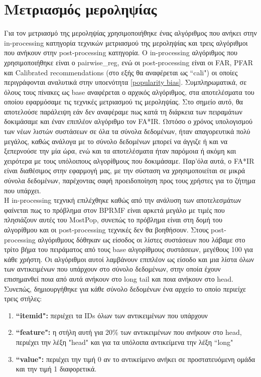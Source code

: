 \newpage
\section{Μετριασμός μεροληψίας}
\noindent Για τον μετριασμό της μεροληψίας χρησιμοποιήθηκε ένας αλγόριθμος που ανήκει στην in-processing κατηγορία τεχνικών μετριασμού της μεροληψίας και τρεις αλγόριθμοι που ανήκουν στην post-processing κατηγορία. Ο in-processing αλγόριθμος που χρησιμοποιήθηκε είναι ο pairwise\_reg, ενώ οι post-processing είναι οι FAR, PFAR και Calibrated recommendations (στο εξής θα αναφέρεται ως ``cali") οι οποίες περιγράφονται αναλυτικά στην υποενότητα \ref{popularity bias}. Συμπληρωματικά, σε όλους τους πίνακες ως base αναφέρεται ο αρχικός αλγόριθμος, στα αποτελέσματα του οποίου εφαρμόσαμε τις τεχνικές μετριασμού τις μεροληψίας. Στο σημείο αυτό, θα αποτελούσε παράλειψη εάν δεν αναφέραμε πως κατά τη διάρκεια των πειραμάτων δοκιμάσαμε και έναν επιπλέον αλγόριθμο τον FA*IR. Ωστόσο ο χρόνος υπολογισμού των νέων λιστών συστάσεων σε όλα τα σύνολα δεδομένων, ήταν απαγορευτικά πολύ μεγάλος, καθώς ανάλογα με το σύνολο δεδομένων μπορεί να άγγιζε ή και να ξεπερνούσε την μία ώρα, ενώ και τα αποτελέσματα ήταν παρόμοια ή ακόμη και χειρότερα με τους υπόλοιπους αλγορίθμους που δοκιμάσαμε. Παρ'όλα αυτά, ο FA*IR είναι διαθέσιμος στην εφαρμογή μας, με την σύσταση να χρησιμοποιείται σε μικρά σύνολα δεδομένων, παρέχοντας σαφή προειδοποίηση προς τους χρήστες για το ζήτημα που υπάρχει.\\ H in-processing τεχνική επιλέχθηκε καθώς από την ανάλυση των αποτελεσμάτων φαίνεται πως το πρόβλημα στον BPRMF είναι αρκετά μεγάλο με τιμές που πλησιάζουν αυτές του MostPop, συνεπώς το πρόβλημα είναι στη δομή του αλγορίθμου και οι post-processing τεχνικές δεν θα βοηθήσουν. Στους post-processing αλγόριθμους δόθηκαν ως είσοδος οι λίστες συστάσεων που λάβαμε στο τρίτο βήμα του πειράματος από τους base αλγορίθμους συστάσεων, μεγέθους 100 για κάθε χρήστη. Οι αλγόριθμοι αυτοί λαμβάνουν επιπλέον ως είσοδο και μια λίστα όλων των αντικειμένων που υπάρχουν στο σύνολο δεδομένων, στην οποία έχουν επισημανθεί ποια από αυτά ανήκουν στο long tail και ποια ανήκουν στο head. Συνεπώς, δημιουργήθηκε για κάθε σύνολο δεδομένων ένα αρχείο το οποίο περιείχε τρεις στήλες:
\begin{enumerate}
	\item  \textbf{``itemid":} περιέχει τα IDs όλων των αντικειμένων που υπάρχουν
	\item \textbf{``feature":} η στήλη αυτή για 20\% των αντικειμένων που ανήκουν στο head, περιέχει την λέξη "head" και για τα υπόλοιπα αντικείμενα την λέξη ``long" 
	\item \textbf{``value":} περιέχει την τιμή 0 αν το αντικείμενο ανήκει σε προστατευόμενη ομάδα και την τιμή 1 διαφορετικά.
\end{enumerate}
